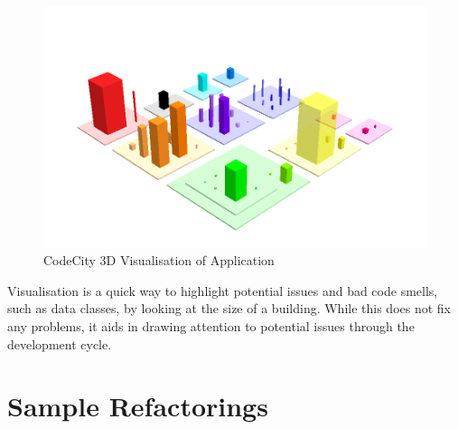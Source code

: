 \begin{figure}[H]
\begin{center}
\includegraphics[scale=0.5]{codecity3d.png}
\caption{CodeCity 3D Visualisation of Application}
\end{center}
\end{figure}

Visualisation is a quick way to highlight potential issues and bad code smells, such as data classes, by looking at the size of a building. While this does not fix any problems, it aids in drawing attention to potential issues through the development cycle. 

\section{Sample Refactorings}
